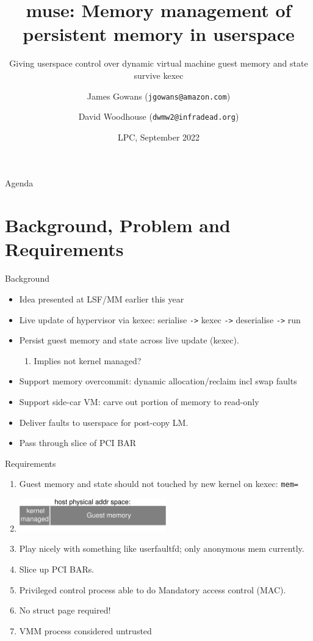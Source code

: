 \documentclass{beamer}
\title{muse: Memory management of persistent memory in userspace}
\subtitle{Giving userspace control over dynamic virtual machine guest memory and state survive kexec}
\author[James Gowans \& David Woodhouse (EC2) ]{James Gowans (\texttt{jgowans@amazon.com}) \\ \and David Woodhouse (\texttt{dwmw2@infradead.org})}
\institute{Amazon / AWS / EC2}
\date{LPC, September 2022}
\begin{document}
\begin{frame}
\titlepage
\end{frame}


\begin{frame}{Agenda}
  \tableofcontents[hideallsubsections]
\end{frame}


\section{Background, Problem and Requirements}

\begin{frame}{Background}
  \begin{itemize}
    \item Idea presented at LSF/MM earlier this year
    \item Live update of hypervisor via kexec: serialise \texttt{->} kexec \texttt{->} deserialise \texttt{->} run
    \item Persist guest memory and state across live update (kexec).
      \begin{enumerate}
        \item Implies not kernel managed?
      \end{enumerate}
    \item Support memory overcommit: dynamic allocation/reclaim incl swap faults
    \item Support side-car VM: carve out portion of memory to read-only
    \item Deliver faults to userspace for post-copy LM.
    \item Pass through slice of PCI BAR
  \end{itemize}
\end{frame}

\begin{frame}{Requirements}
  \begin{enumerate}
    \item Guest memory and state should not touched by new kernel on kexec: \texttt{mem=}
    \item \includegraphics[width=0.5\textwidth]{memmac-memory}
    \item Play nicely with something like userfaultfd; only anonymous mem currently.
    \item Slice up PCI BARs.
    \item Privileged control process able to do Mandatory access control (MAC).
    \item No struct page required!
    \item VMM process considered untrusted
  \end{enumerate}
\end{frame}
\end{document}
